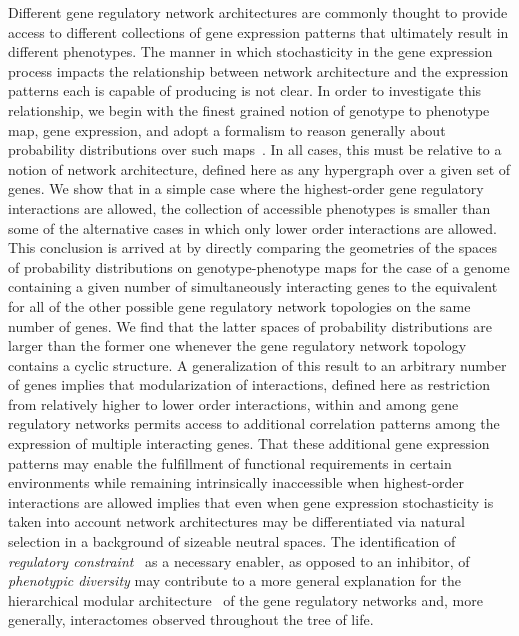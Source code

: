 Different gene regulatory network architectures are commonly thought to provide access to different collections of gene expression patterns that ultimately result in different phenotypes. The manner in which stochasticity in the gene expression process impacts the relationship between network architecture and the expression patterns each is capable of producing is not clear. In order to investigate this relationship, we begin with the finest grained notion of genotype to phenotype map, gene expression, and adopt a formalism to reason generally about probability distributions over such maps~\cite{Lane1998,MacLane1992,Awodey2006,Abramsky2011}. In all cases, this must be relative to a notion of network architecture, defined here as any hypergraph over a given set of genes. We show that in a simple case where the highest-order gene regulatory interactions are allowed, the collection of accessible phenotypes is smaller than some of the alternative cases in which only lower order interactions are allowed. This conclusion is arrived at by directly comparing the geometries of the spaces of probability distributions on genotype-phenotype maps for the case of a genome containing a given number of simultaneously interacting genes to the equivalent for all of the other possible gene regulatory network topologies on the same number of genes. We find that the latter spaces of probability distributions are larger than the former one whenever the gene regulatory network topology contains a cyclic structure. A generalization of this result to an arbitrary number of genes implies that modularization of interactions, defined here as restriction from relatively higher to lower order interactions, within and among gene regulatory networks permits access to additional correlation patterns among the expression of multiple interacting genes. That these additional gene expression patterns may enable the fulfillment of functional requirements in certain environments while remaining intrinsically inaccessible when highest-order interactions are allowed implies that even when gene expression stochasticity is taken into account network architectures may be differentiated via natural selection in a background of sizeable neutral spaces. The identification of \emph{regulatory constraint}~\cite{Bar-Even2006,Johnson2010a} as a necessary enabler, as opposed to an inhibitor, of \emph{phenotypic diversity} may contribute to a more general explanation for the hierarchical modular architecture~\cite{Ravasz2002,Segre2005,Wagner2007,Erwin2009,Jothi2009,Bhardwaj2010,Colm} of the gene regulatory networks and, more generally, interactomes observed throughout the tree of life.
